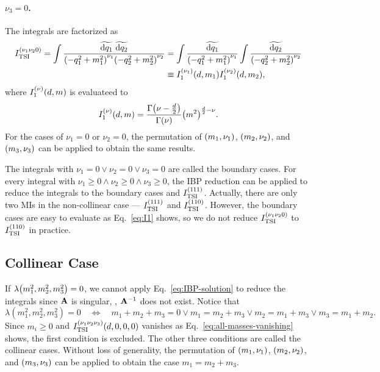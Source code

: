 \documentclass{article}
\begin{document}
            \paragraph{\boldmath $\nu_3 = 0$.}
            The integrals are factorized as
            \begin{equation}
                \begin{aligned}
                    \TSI{\nu_1 \nu_2 0} = \int \frac{\tildedp{q_1} ~ \tildedp{q_2}}{\qmOne* \qmTwo*} & = \int \frac{\tildedp{q_1}}{\qmOne*} \int \frac{\tildedp{q_2}}{\qmTwo*} \\
                    & \equiv \Ione{\nu_1}[d, m_1] \Ione{\nu_2}[d, m_2],
                \end{aligned}
                \label{eq:TSI-factorization}
            \end{equation}
            where $\Ione{\nu}[d, m]$ is evaluateed to \cite[Eq.~(10.1)]{Smirnov:2012gma}
            \begin{equation}
                \Ione{\nu}[d, m] = \frac{\Gamma\qty(\nu - \frac{d}{2})}{\Gamma(\nu)} \qty(m^2)^{\frac{d}{2} - \nu}.
                \label{eq:I1}
            \end{equation}
            For the cases of $\nu_1 = 0$ or $\nu_2 = 0$, the permutation of $\qty(m_1, \nu_1)$, $\qty(m_2, \nu_2)$, and $\qty(m_3, \nu_3)$ can be applied to obtain the same results.

            The integrals with $\nu_1 = 0 \lor \nu_2 = 0 \lor \nu_3 = 0$ are called the boundary cases.
            For every integral with $\nu_1 \ge 0 \land \nu_2 \ge 0 \land \nu_3 \ge 0$, the IBP reduction can be applied to reduce the integrals to the boundary cases and $\TSI{111}$.
            Actually, there are only two MIs in the non-collinear case --- $\TSI{111}$ and $\TSI{110}$.
            However, the boundary cases are easy to evaluate as Eq.~\eqref{eq:I1} shows, so we do not reduce $\TSI{\nu_1 \nu_2 0}$ to $\TSI{110}$ in practice.

        \subsection{Collinear Case}

            If $\lambdaFun{m_1^2, m_2^2, m_3^2} = 0$, we cannot apply Eq.~\eqref{eq:IBP-solution} to reduce the integrals since $\vb{A}$ is singular, \ie, $\vb{A}^{-1}$ does not exist.
            Notice that
            \begin{equation}
                \lambda(m_1^2, m_2^2, m_3^2) = 0 \quad \Longleftrightarrow \quad m_1 + m_2 + m_3 = 0 \lor m_1 = m_2 + m_3 \lor m_2 = m_1 + m_3 \lor m_3 = m_1 + m_2.
            \end{equation}
            Since $m_i \ge 0$ and $\TSI{\nu_1 \nu_2 \nu_3}[d, 0, 0, 0]$ vanishes as Eq.~\eqref{eq:all-masses-vanishing} shows, the first condition is excluded.
            The other three conditions are called the collinear cases.
            Without loss of generality, the permutation of $\qty(m_1, \nu_1)$, $\qty(m_2, \nu_2)$, and $\qty(m_3, \nu_3)$ can be applied to obtain the case $m_1 = m_2 + m_3$.
\end{document}
